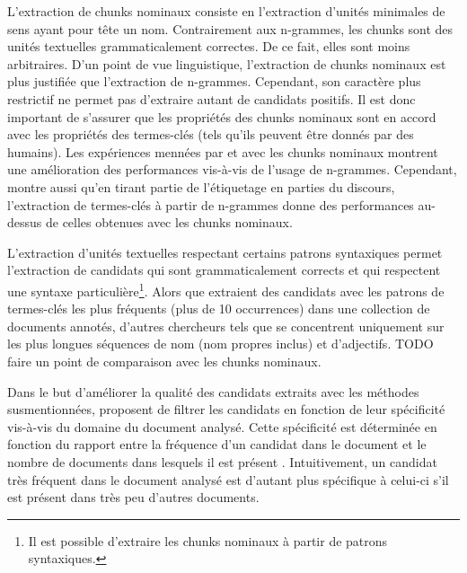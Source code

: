     L'extraction de chunks nominaux consiste en l'extraction d'unités minimales
    de sens ayant pour tête un nom. Contrairement aux n-grammes, les chunks sont
    des unités textuelles grammaticalement correctes. De ce fait, elles sont
    moins arbitraires. D'un point de vue linguistique, l'extraction de chunks
    nominaux est plus justifiée que l'extraction de n-grammes. Cependant, son
    caractère plus restrictif ne permet pas d'extraire autant de candidats
    positifs. Il est donc important de s'assurer que les propriétés des chunks
    nominaux sont en accord avec les propriétés des termes-clés (tels qu'ils
    peuvent être donnés par des humains). Les expériences mennées par
     et  avec les
    chunks nominaux montrent une amélioration des performances vis-à-vis de
    l'usage de n-grammes. Cependant,  montre
    aussi qu'en tirant partie de l'étiquetage en parties du discours,
    l'extraction de termes-clés à partir de n-grammes donne des performances
    au-dessus de celles obtenues avec les chunks nominaux.

    L'extraction d'unités textuelles respectant certains patrons syntaxiques
    permet l'extraction de candidats qui sont grammaticalement corrects et qui
    respectent une syntaxe particulière\footnote{Il est possible d'extraire les
    chunks nominaux à partir de patrons syntaxiques.}. Alors que
     extraient des candidats avec les
    patrons de termes-clés les plus fréquents (plus de 10 occurrences) dans une
    collection de documents annotés, d'autres chercheurs tels que
     se concentrent uniquement sur les plus longues
    séquences de nom (nom propres inclus) et d'adjectifs. TODO faire un point de
    comparaison avec les chunks nominaux.

    Dans le but d'améliorer la qualité des candidats extraits avec les méthodes
    susmentionnées,  proposent de filtrer les
    candidats en fonction de leur spécificité vis-à-vis du domaine du document
    analysé. Cette spécificité est déterminée en fonction du rapport entre la
    fréquence d'un candidat dans le document et le nombre de documents dans
    lesquels il est présent \cite[TF-IDF]{jones1972tfidf}. Intuitivement, un
    candidat très fréquent dans le document analysé est d'autant plus spécifique
    à celui-ci s'il est présent dans très peu d'autres documents.
    
